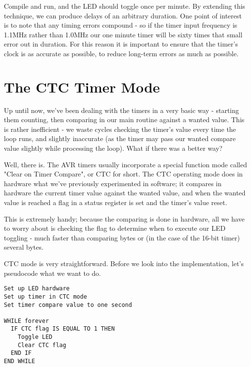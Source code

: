 \documentclass[a4paper,oneside,notitlepage]{book}
\begin{document}
Compile and run, and the LED should toggle once per minute. By extending this technique, we can produce delays of an arbitrary duration. One point of interest is to note that any timing errors compound - so if the timer input frequency is 1.1MHz rather than 1.0MHz our one minute timer will be sixty times that small error out in duration. For this reason it is important to ensure that the timer's clock is as accurate as possible, to reduce long-term errors as much as possible.


\label{chp:CTCMode}
\chapter{The CTC Timer Mode}

Up until now, we've been dealing with the timers in a very basic way - starting them counting, then comparing in our main routine against a wanted value. This is rather inefficient - we waste cycles checking the timer's value every time the loop runs, and slightly inaccurate (as the timer may pass our wanted compare value slightly while processing the loop). What if there was a better way?

Well, there is. The AVR timers usually incorporate a special function mode called "Clear on Timer Compare", or CTC for short. The CTC operating mode does in hardware what we've previously experimented in software; it compares in hardware the current timer value against the wanted value, and when the wanted value is reached a flag in a status register is set and the timer's value reset.

This is extremely handy; because the comparing is done in hardware, all we have to worry about is checking the flag to determine when to execute our LED toggling - much faster than comparing bytes or (in the case of the 16-bit timer) several bytes.

CTC mode is very straightforward. Before we look into the implementation, let's pseudocode what we want to do. 

\begin{center}
\begin{lstlisting}[keywordstyle=\color{black},commentstyle=\color{black}]
Set up LED hardware
Set up timer in CTC mode
Set timer compare value to one second

WHILE forever
  IF CTC flag IS EQUAL TO 1 THEN
    Toggle LED
    Clear CTC flag
  END IF
END WHILE 
\end{lstlisting}
\end{center}
\end{document}
